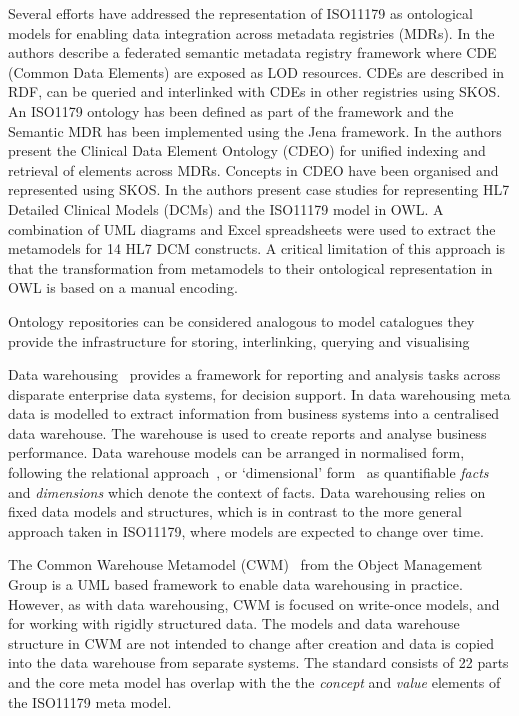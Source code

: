 
Several efforts have addressed the representation of ISO11179 as
ontological models for enabling data integration across metadata
registries (MDRs). In \cite{Sinaci2013784} the authors describe a
federated semantic metadata registry framework where CDE (Common Data
Elements) are exposed as LOD resources. CDEs are described in RDF, can
be queried and interlinked with CDEs in other registries using
SKOS. An ISO1179 ontology has been defined as part of the framework
and the Semantic MDR has been implemented using the Jena framework. In
\cite{pmid25405066} the authors present the Clinical Data Element
Ontology (CDEO) for unified indexing and retrieval of elements across
MDRs. Concepts in CDEO have been organised and represented using
SKOS. In \cite{pmid22211181} the authors present case studies for
representing HL7 Detailed Clinical Models (DCMs) and the ISO11179
model in OWL. A combination of UML diagrams and Excel spreadsheets
were used to extract the metamodels for 14 HL7 DCM constructs. A
critical limitation of this approach is that the transformation from
metamodels to their ontological representation in OWL is based on a
manual encoding.


Ontology repositories can be considered analogous to model catalogues
 they provide the infrastructure for storing, interlinking, querying and visualising 


Data warehousing~\cite{kim02} provides a framework for reporting and analysis tasks across disparate enterprise data systems, for decision support. In data warehousing meta data is modelled to extract information from business systems into a centralised data warehouse. The warehouse is used to create reports and analyse business performance. Data warehouse models can be arranged in normalised form, following the relational approach~\cite{inm92}, or `dimensional’ form~\cite{kim02} as quantifiable \emph{facts} and \emph{dimensions} which denote the context of facts. Data warehousing relies on fixed data models and structures, which is in contrast to the more general approach taken in ISO11179, where models are expected to change over time. 

The Common Warehouse Metamodel (CWM)~\cite{poole03} from the Object Management Group is a UML based framework to enable data warehousing in practice. However, as with data warehousing, CWM is focused on write-once models, and for working with rigidly structured data. The models and data warehouse structure in CWM are not intended to change after creation and data is copied into the data warehouse from separate systems. The standard consists of 22 parts and the core meta model has overlap with the the \emph{concept} and \emph{value} elements of the ISO11179 meta model.


